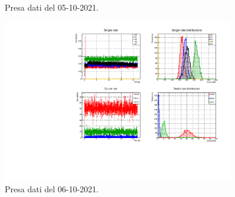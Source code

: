 \documentclass[11pt,a4paper]{article}
\begin{document}
\begin{figure}
\caption{Presa dati del 05-10-2021.}
\end{figure} \begin{figure}
\includegraphics[width=0.9\textwidth]{Immagini/20211006.pdf}
\caption{Presa dati del 06-10-2021.}
\end{figure}   
\end{document}
